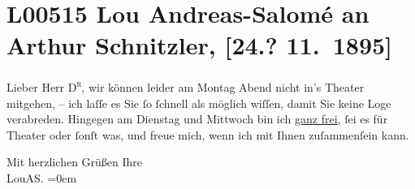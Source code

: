 

\section[Lou Andreas-Salomé an Arthur Schnitzler, {[}24.? 11. 1895{]}]{L00515 Lou Andreas-Salomé an Arthur Schnitzler, {[}24.? 11. 1895{]}}
\nopagebreak{}
\rehead{ }\normalsize\beginnumbering{}
\toendnotes[C]{\smallbreak\pagebreak[2]}
\pstart
           \noindent{}{\pb}Lieber Herr \textsc{D\textsuperscript{r}}, wir können leider am Montag Abend nicht in’s Theater
               mitgehen, – ich laſſe es Sie ſo ſchnell als möglich wiſſen, damit Sie keine Loge
               verabreden. Hingegen am Dienstag und Mittwoch bin ich \uline{ganz frei}, ſei es für Theater oder ſonſt was, und
               freue mich, wenn ich mit Ihnen zuſammenſein kann.\pend
           
\pstart
           Mit herzlichen Grüßen Ihre{\\[\baselineskip]}\spacefill\mbox{LouAS.}\pend
           \leftskip=0em{}\endnumbering{}  
      